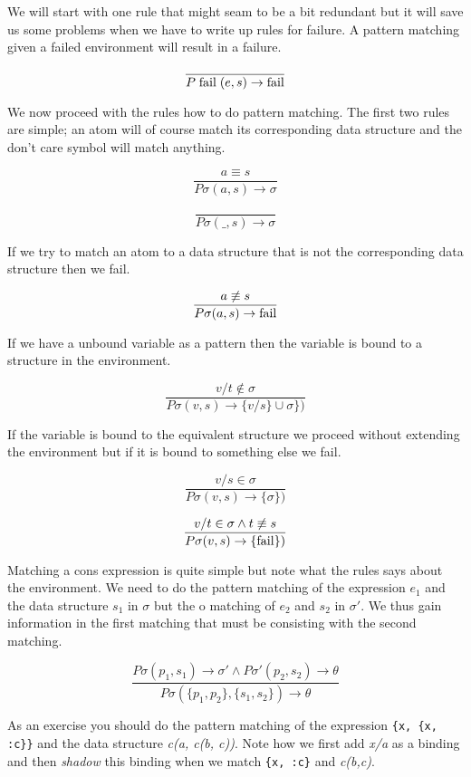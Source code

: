 \documentclass[a4paper,11pt]{article}
\begin{document}
We will start with one rule that might seam to be a bit redundant but
it will save us some problems when we have to write up rules for
failure. A pattern matching given a failed environment will result in
a failure.

$$\frac{}{P\;{\rm fail}\;(e, s) \rightarrow {\rm fail}}$$ 

We now proceed with the rules how to do pattern matching. The first
two rules are simple; an atom will of course match its corresponding
data structure and the don't care symbol will match anything.

$$\frac{a \equiv s}{P\sigma(a, s) \rightarrow \sigma}$$ 

$$\frac{}{P\sigma(\_,s) \rightarrow \sigma}$$

If we try to match an atom to a data structure that is not the
corresponding data structure then we fail.

$$\frac{a \not\equiv s}{P\sigma(a, s) \rightarrow {\rm fail}}$$ 

If we have a unbound variable as a pattern then the variable is bound to a
structure in the environment. 

$$\frac{v/t \not\in \sigma}{P\sigma(v, s) \rightarrow \lbrace v/s \rbrace \cup \sigma \rbrace) }$$ 

If the variable is bound to the equivalent structure we proceed
without extending the environment but if it is bound to something else
we fail.

$$\frac{v/s \in \sigma}{P\sigma(v, s) \rightarrow \lbrace \sigma \rbrace) }$$

$$\frac{v/t \in \sigma \wedge t \not\equiv s}{P\sigma(v, s) \rightarrow \lbrace {\rm fail} \rbrace) }$$ 

Matching a cons expression is quite simple but note what the rules
says about the environment. We need to do the pattern matching of the
expression $e_1$ and the data structure $s_1$ in $\sigma$ but the o
matching of $e_2$ and $s_2$ in $\sigma'$. We thus gain information in
the first matching that must be consisting with the second matching.

$$\frac{P\sigma(p_1, s_1) \rightarrow \sigma' \wedge P\sigma'(p_2, s_2) \rightarrow \theta}{P\sigma(\lbrace p_1, p_2 \rbrace  , \lbrace s_1, s_2 \rbrace) \rightarrow \theta}$$

As an exercise you should do the pattern matching of the expression
{\tt \{x, \{x, :c\}\}} and the data structure {\em c(a, c(b, c))}. Note
how we first add {\em x/a} as a binding and then {\em shadow} this binding when
we match {\tt \{x, :c\}} and {\em c(b,c)}.
\end{document}
